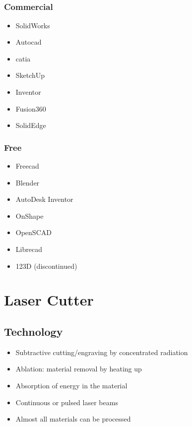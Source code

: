 \documentclass[aspectratio=169]{beamer}
\begin{document}
\subsection{}
\subsubsection{Commercial}
\begin{frame}
    \begin{itemize}
        \item SolidWorks
        \item Auto\acs{cad}
        \item \acs{catia}
        \item SketchUp
        \item Inventor
        \item Fusion360
        \item SolidEdge
    \end{itemize}
\end{frame}

\subsubsection{Free}
\begin{frame}
    \begin{itemize}
        \item Free\acs{cad}
        \item Blender
        \item AutoDesk Inventor
        \item OnShape
        \item OpenSCAD
        \item Libre\acs{cad}
        \item 123D (discontinued)
    \end{itemize}
\end{frame}

\section{Laser Cutter}

\subsection{Technology}

\begin{frame}
    \begin{itemize}
        \item Subtractive cutting/engraving by concentrated radiation
        \item Ablation: material removal by heating up
        \item Absorption of energy in the material
        \item Continuous or pulsed laser beams
        \item Almost all materials can be processed
    \end{itemize}
\end{frame}
\end{document}
